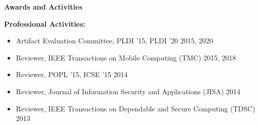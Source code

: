 \documentclass[letterpaper,11pt]{article}
\newcommand{\resheading}[1]{{\large \colorbox{mygrey}{\begin{minipage}{\textwidth}{\textbf{#1 \vphantom{p\^{E}}}}\end{minipage}}}}
\begin{document}

\resheading{Awards and Activities}
  \begin{description}
\item\textbf{Professional Activities:}
\begin{itemize}
\item Artifact Evaluation Committee, PLDI '15, PLDI '20 \hfill 2015, 2020
\item Reviewer, IEEE Transactions on Mobile Computing (TMC) \hfill 2015, 2018
\item Reviewer, POPL '15, ICSE '15 \hfill 2014
\item Reviewer, Journal of Information Security and Applications (JISA) \hfill 2014
\item Reviewer, IEEE Transactions on Dependable and Secure Computing (TDSC) \hfill 2013
\end{itemize}
  \end{description} %
\end{document}
